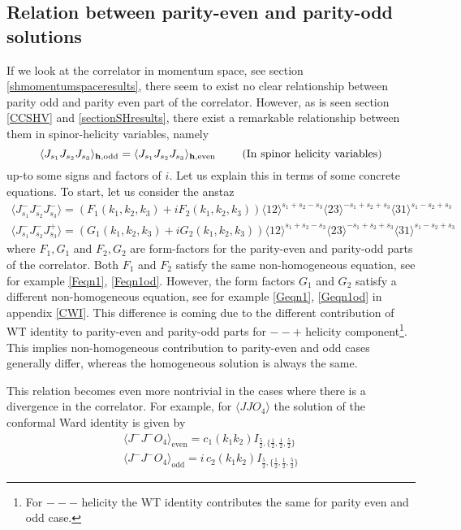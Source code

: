 \documentclass[a4paper,11pt]{article}
\begin{document}
\subsection{Relation between parity-even and parity-odd solutions}
If we look at the correlator in momentum space, see section \ref{shmomentumspaceresults}, there seem to exist no clear relationship between parity odd and parity even part of the correlator. However, as is seen section \ref{CCSHV} and \ref{sectionSHresults}, there exist a remarkable relationship between them in spinor-helicity variables, namely
\begin{equation}\label{pepore}
   \langle J_{s_1} J_{s_2} J_{s_3} \rangle_{\bf{h},\text{odd}}  =  \langle J_{s_1} J_{s_2} J_{s_3} \rangle_{\bf{h},\text{even}}~~~~ ~~~(\rm{In~spinor~helicity~variables})
\end{equation} up-to some signs and factors of $i.$ 
Let us explain this in terms of some concrete equations. To start, let us consider the anstaz
\begin{align}
 \langle J_{s_1}^{-} J_{s_2}^{-} J_{s_3}^{-} \rangle =(F_{1}(k_1,k_2,k_3)+ i F_{2}(k_1,k_2,k_3)) \langle 1 2\rangle^{s_1 +s_2 -s_3}  \langle 2 3\rangle^{-s_1 +s_2 +s_3}  \langle 3 1\rangle^{s_1 -s_2 +s_3} \nonumber\\
  \langle J_{s_1}^{-} J_{s_2}^{-} J_{s_3}^{+} \rangle =(G_{1}(k_1,k_2,k_3)+ i G_{2}(k_1,k_2,k_3)) \langle 1 2\rangle^{s_1 +s_2 -s_3}  \langle 2 3\rangle^{-s_1 +s_2 +s_3}  \langle 3 1\rangle^{s_1 -s_2 +s_3} 
\end{align} 
where $F_1,G_1$ and $F_2,G_2$ are form-factors for the parity-even and parity-odd parts of the correlator. Both $F_1$ and $F_2$ satisfy the same non-homogeneous equation, see for example \eqref{Feqn1}, \eqref{Feqn1od}. However, the form factors $G_1$ and $G_2$ satisfy a different non-homogeneous equation,  see for example \eqref{Geqn1}, \eqref{Geqn1od} in appendix \ref{CWI}. This difference is coming due to the different contribution of WT identity to parity-even and parity-odd parts for $--+$ helicity component\footnote{For $---$ helicity the WT identity contributes the same for parity even and odd case.}. This implies non-homogeneous contribution to  parity-even and odd cases generally differ, whereas the homogeneous solution is always the same. 
\par
This relation becomes even more nontrivial in the cases where there is a divergence in the correlator. For example, for 
$ \langle J J O_{4} \rangle$ the solution of the conformal Ward identity is given by
\begin{align}
    \langle J^{-} J^{-} O_{4} \rangle_{\text{even}}=c_1(k_1k_2)I_{\frac 52,\{\frac 12,\frac 12,\frac 52\}} \\
    \langle J^{-} J^{-} O_{4} \rangle_{\text{odd}}=i\,c_2(k_1k_2)I_{\frac 52,\{\frac 12,\frac 12,\frac 52\}}
\end{align}
\end{document}
